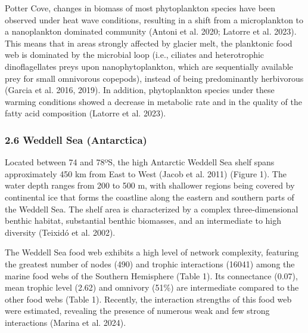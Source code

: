 \documentclass[
]{article}
\begin{document}
Potter Cove, changes in biomass of most phytoplankton species have been
observed under heat wave conditions, resulting in a shift from a
microplankton to a nanoplankton dominated community (Antoni et al. 2020;
Latorre et al. 2023). This means that in areas strongly affected by
glacier melt, the planktonic food web is dominated by the microbial loop
(i.e., ciliates and heterotrophic dinoflagellates preys upon
nanophytoplankton, which are sequentially available prey for small
omnivorous copepods), instead of being predominantly herbivorous (Garcia
et al. 2016, 2019). In addition, phytoplankton species under these
warming conditions showed a decrease in metabolic rate and in the
quality of the fatty acid composition (Latorre et al. 2023).

\subsubsection{2.6 Weddell Sea
(Antarctica)}\label{weddell-sea-antarctica}

Located between 74 and 78ºS, the high Antarctic Weddell Sea shelf spans
approximately 450 km from East to West (Jacob et al. 2011) (Figure 1).
The water depth ranges from 200 to 500 m, with shallower regions being
covered by continental ice that forms the coastline along the eastern
and southern parts of the Weddell Sea. The shelf area is characterized
by a complex three-dimensional benthic habitat, substantial benthic
biomasses, and an intermediate to high diversity (Teixidó et al. 2002).

The Weddell Sea food web exhibits a high level of network complexity,
featuring the greatest number of nodes (490) and trophic interactions
(16041) among the marine food webs of the Southern Hemisphere (Table 1).
Its connectance (0.07), mean trophic level (2.62) and omnivory (51\%)
are intermediate compared to the other food webs (Table 1). Recently,
the interaction strengths of this food web were estimated, revealing the
presence of numerous weak and few strong interactions (Marina et al.
2024).
\end{document}
